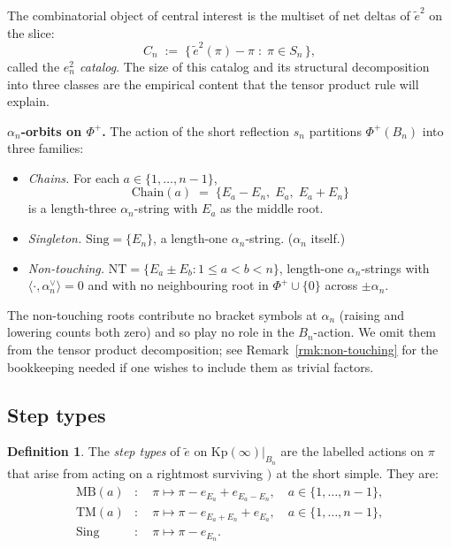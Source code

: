 \documentclass[11pt]{article}
\theoremstyle{definition}
\newtheorem{definition}[theorem]{Definition}
\theoremstyle{remark}
\newcommand{\Kp}{\mathrm{Kp}}
\newcommand{\NT}{\mathrm{NT}}
\newcommand{\Sing}{\mathrm{Sing}}
\newcommand{\Chain}{\mathrm{Chain}}
\newcommand{\MB}{\mathrm{MB}}
\newcommand{\TM}{\mathrm{TM}}
\newcommand{\labr}[1]{{)}_{#1}}
\begin{document}
The combinatorial object of central interest is the multiset of net deltas of $\tilde e^2$
on the slice:
\[
C_n \;:=\; \bigl\{\,\tilde e^2(\pi) - \pi \;:\; \pi \in S_n\,\bigr\},
\]
called the \emph{$e_n^2$ catalog}. The size of this catalog and its structural decomposition
into three classes are the empirical content that the tensor product rule will explain.

\medskip
\noindent\textbf{$\alpha_n$-orbits on $\Phi^+$.}
The action of the short reflection $s_n$ partitions $\Phi^+(B_n)$ into three families:

\begin{itemize}[leftmargin=2em]
  \item \emph{Chains.} For each $a \in \{1, \ldots, n-1\}$,
    \[
    \Chain(a) \;=\; \{E_a - E_n,\; E_a,\; E_a + E_n\}
    \]
    is a length-three $\alpha_n$-string with $E_a$ as the middle root.
  \item \emph{Singleton.} $\Sing = \{E_n\}$, a length-one $\alpha_n$-string. ($\alpha_n$
    itself.)
  \item \emph{Non-touching.} $\NT = \{E_a \pm E_b : 1 \leq a < b < n\}$, length-one
    $\alpha_n$-strings with $\langle \cdot, \alpha_n^\vee\rangle = 0$ and with no neighbouring
    root in $\Phi^+ \cup \{0\}$ across $\pm \alpha_n$.
\end{itemize}

The non-touching roots contribute no bracket symbols at $\alpha_n$ (raising and lowering
counts both zero) and so play no role in the $B_n$-action. We omit them from the tensor
product decomposition; see Remark~\ref{rmk:non-touching} for the bookkeeping needed if one
wishes to include them as trivial factors.

\subsection{Step types}\label{ssec:step-types}

\begin{definition}\label{def:step-types}
The \emph{step types} of $\tilde e$ on $\Kp(\infty)|_{B_n}$ are the labelled actions on
$\pi$ that arise from acting on a rightmost surviving $\labr{}$ at the short simple. They are:
\begin{align*}
\MB(a) &: \quad \pi \mapsto \pi - e_{E_a} + e_{E_a - E_n}, \quad a \in \{1, \ldots, n-1\}, \\
\TM(a) &: \quad \pi \mapsto \pi - e_{E_a + E_n} + e_{E_a}, \quad a \in \{1, \ldots, n-1\}, \\
\Sing &: \quad \pi \mapsto \pi - e_{E_n}.
\end{align*}
\end{definition}
\end{document}
